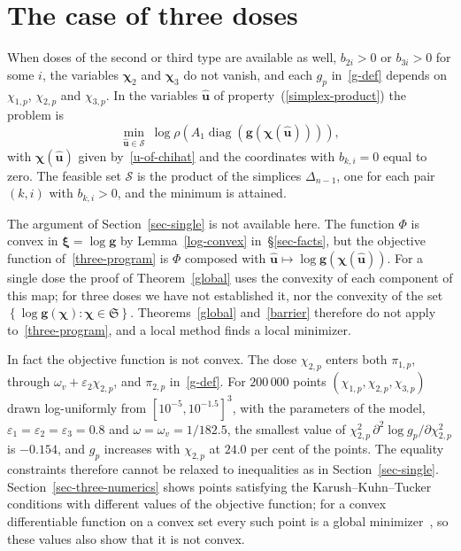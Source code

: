\documentclass[11pt]{article}
\theoremstyle{plain}
\theoremstyle{definition}
\theoremstyle{remark}
\numberwithin{equation}{section}
\numberwithin{figure}{section}
\numberwithin{table}{section}
\begin{document}
\section{The case of three doses}\label{sec-three}

When doses of the second or third type are available as well, $b_{2i}>0$ or
$b_{3i}>0$ for some $i$, the variables $\bm\chi_2$ and $\bm\chi_3$ do not vanish,
and each $g_p$ in~\eqref{g-def} depends on $\chi_{1,p}$, $\chi_{2,p}$ and
$\chi_{3,p}$. In the variables $\widehat{\bm u}$ of property~(\ref{simplex-product})
the problem is
\begin{equation}\label{three-program}
\min_{\widehat{\bm u}\in\mathcal{S}}\
\log\rho\left(A_1\operatorname{diag}\left(\bm g\left(\bm\chi(\widehat{\bm u})\right)\right)\right),
\end{equation}
with $\bm\chi(\widehat{\bm u})$ given by~\eqref{u-of-chihat} and the
coordinates with $b_{k,i}=0$ equal to zero. The feasible set $\mathcal{S}$ is
the product of the simplices $\Delta_{n-1}$, one for each pair $(k,i)$ with
$b_{k,i}>0$, and the minimum is attained.

The argument of Section~\ref{sec-single} is not available here. The function
$\Phi$ is convex in $\bm\xi=\log\bm g$ by Lemma~\ref{log-convex} in~\S\ref{sec-facts}, but the
objective function of~\eqref{three-program} is $\Phi$ composed with
$\widehat{\bm u}\mapsto\log\bm g\left(\bm\chi(\widehat{\bm u})\right)$.
For a single dose the proof of Theorem~\ref{global} uses the convexity of each
component of this map; for three doses we have not established it, nor the
convexity of the set $\left\{\log\bm g(\bm\chi):\bm\chi\in\mathfrak{S}\right\}$. Theorems~\ref{global} and~\ref{barrier} therefore do not apply
to~\eqref{three-program}, and a local method finds a local minimizer.

In fact the objective function is not convex. The dose $\chi_{2,p}$ enters both
$\pi_{1,p}$, through $\omega_v+\varepsilon_2\chi_{2,p}$, and $\pi_{2,p}$
in~\eqref{g-def}. For $200\,000$ points $(\chi_{1,p},\chi_{2,p},\chi_{3,p})$
drawn log-uniformly from $\left[10^{-5},10^{-1.5}\right]^3$, with the
parameters of the model, $\varepsilon_1=\varepsilon_2=\varepsilon_3=0.8$ and
$\omega=\omega_v=1/182.5$, the smallest value of
$\chi_{2,p}^2\,\partial^2\log g_p/\partial \chi_{2,p}^2$ is $-0.154$, and $g_p$
increases with $\chi_{2,p}$ at $24.0$ per cent of the points. The equality
constraints therefore cannot be relaxed to inequalities as in
Section~\ref{sec-single}. Section~\ref{sec-three-numerics} shows points
satisfying the Karush--Kuhn--Tucker conditions with different values of the
objective function; for a convex differentiable function on a convex set every
such point is a global minimizer~\cite[Section 4.2.3]{2004Boyd_Vandenberghe},
so these values also show that it is not convex.
\end{document}
